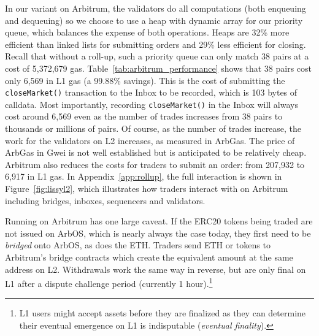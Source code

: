 In our \cm variant on Arbitrum, the validators do all computations (both enqueuing and dequeuing) so we choose to use a heap with dynamic array for our priority queue, which balances the expense of both operations. Heaps are 32\% more efficient than linked lists for submitting orders and 29\% less efficient for closing. Recall that without a roll-up, such a priority queue can only match 38 pairs at a cost of 5,372,679 gas. Table~\ref{tab:arbitrum_performance} shows that 38 pairs cost only 6,569 in L1 gas (a 99.88\% savings). This is the cost of submitting the \texttt{closeMarket()} transaction to the Inbox to be recorded, which is 103 bytes of calldata. Most importantly, recording \texttt{closeMarket()} in the Inbox will always cost around 6,569 even as the number of trades increases from 38 pairs to thousands or millions of pairs. Of course, as the number of trades increase, the work for the validators on L2 increases, as measured in ArbGas. The price of ArbGas in Gwei is not well established but is anticipated to be relatively cheap.  Arbitrum also reduces the costs for traders to submit an order: from 207,932 to 6,917 in L1 gas. In Appendix~\ref{app:rollup}, the full interaction is shown in Figure~\ref{fig:lissyl2}, which illustrates how traders interact with \cm on Arbitrum including bridges, inboxes, sequencers and validators.

Running \cm on Arbitrum has one large caveat. If the ERC20 tokens being traded are not issued on ArbOS, which is nearly always the case today, they first need to be \textit{bridged} onto ArbOS, as does the ETH. Traders send ETH or tokens to Arbitrum's bridge contracts which create the equivalent amount at the same address on L2. Withdrawals work the same way in reverse, but are only final on L1 after a dispute challenge period (currently 1 hour).\footnote{L1 users might accept assets before they are finalized as they can determine their eventual emergence on L1 is indisputable (\textit{eventual finality}).} 



